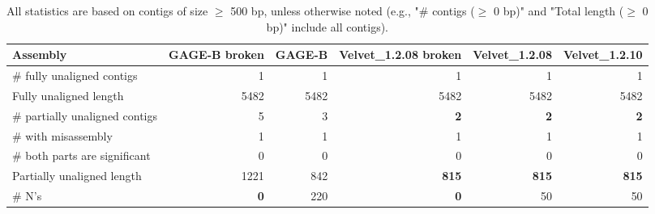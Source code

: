 \documentclass[12pt,a4paper]{article}
\begin{document}
\begin{table}[ht]
\begin{center}
\caption{All statistics are based on contigs of size $\geq$ 500 bp, unless otherwise noted (e.g., "\# contigs ($\geq$ 0 bp)" and "Total length ($\geq$ 0 bp)" include all contigs).}
\begin{tabular}{|l*{5}{|r}|}
\hline
Assembly & GAGE-B broken & GAGE-B & Velvet\_1.2.08 broken & Velvet\_1.2.08 & Velvet\_1.2.10 \\ \hline
\# fully unaligned contigs & 1 & 1 & 1 & 1 & 1 \\ \hline
Fully unaligned length & 5482 & 5482 & 5482 & 5482 & 5482 \\ \hline
\# partially unaligned contigs & 5 & 3 & {\bf 2} & {\bf 2} & {\bf 2} \\ \hline
\hspace{5mm}\# with misassembly & 1 & 1 & 1 & 1 & 1 \\ \hline
\hspace{5mm}\# both parts are significant & 0 & 0 & 0 & 0 & 0 \\ \hline
Partially unaligned length & 1221 & 842 & {\bf 815} & {\bf 815} & {\bf 815} \\ \hline
\# N's & {\bf 0} & 220 & {\bf 0} & 50 & 50 \\ \hline
\end{tabular}
\end{center}
\end{table}
\end{document}

